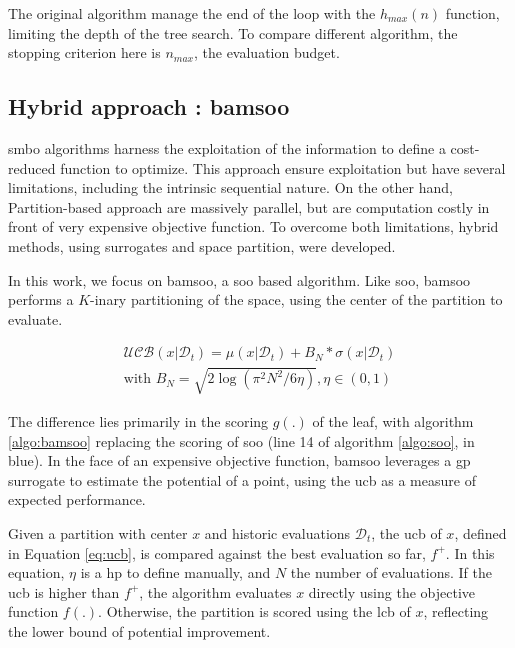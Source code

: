 The original algorithm manage the end of the loop with the $h_{max}(n)$ function, limiting the depth of the tree search. To compare different algorithm, the stopping criterion here is $n_{max}$, the evaluation budget. 


\subsection{Hybrid approach : \acrfull{bamsoo}}
\label{sec:bamsoo}
\acrfull{smbo} algorithms harness the exploitation of the information to define a cost-reduced function to optimize. This approach ensure exploitation but have several limitations, including the intrinsic sequential nature. On the other hand, Partition-based approach are massively parallel, but are computation costly in front of very expensive objective function. To overcome both limitations, hybrid methods, using surrogates and space partition, were developed.

In this work, we focus on \acrshort{bamsoo}, a \acrshort{soo} based algorithm. Like \acrshort{soo}, \acrshort{bamsoo} performs a $K$-inary partitioning of the space, using the center of the partition to evaluate. 

\begin{equation}
    \begin{split}
    \mathcal{UCB}(x| \mathcal D_t) = \mu(x|\mathcal D_t) +  B_N * \sigma(x|\mathcal D_t) 
    \\ \text{with } B_N = \sqrt{2 \log (\pi^2 N^2/6 \eta)} , \eta \in (0,1)      
    \end{split}  
    \label{eq:ucb}
\end{equation}

The difference lies primarily in the scoring $g(.)$ of the leaf, with algorithm \ref{algo:bamsoo} replacing the scoring of \acrshort{soo} (line 14 of algorithm \ref{algo:soo}, in blue). In the face of an expensive objective function, \acrshort{bamsoo} leverages a \acrshort{gp} surrogate to estimate the potential of a point, using the \acrfull{ucb} as a measure of expected performance. 

Given a partition with center $x$ and historic evaluations $\mathcal{D}_t$, the \acrshort{ucb} of $x$, defined in Equation \ref{eq:ucb}, is compared against the best evaluation so far, $f^+$. In this equation, $\eta$ is a \gls{hp} to define manually, and $N$ the number of evaluations. If the \acrshort{ucb} is higher than $f^+$, the algorithm evaluates $x$ directly using the objective function $f(.)$. Otherwise, the partition is scored using the \acrfull{lcb} of $x$, reflecting the lower bound of potential improvement.

